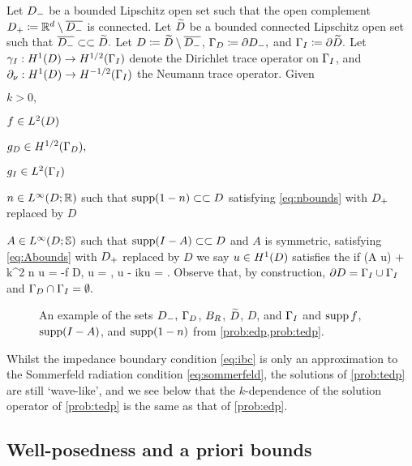 \label{prob:tedp}
 Let $D_{-}$ be a bounded Lipschitz open set such that the open complement $D_{+} \coloneqq \mathbb R^{d} \setminus \overline{D_{-}}$ is connected. Let $\widetilde{D}$ be a bounded connected Lipschitz open set such that $\overline{D_{-}} \subset\subset \widetilde{D}.$ Let $D \coloneqq \widetilde{D} \setminus \overline{D_{-}}$, $\Gamma_{D} \coloneqq \partial D_{-},$ and $\Gamma_{I} \coloneqq \partial \widetilde{D}.$ Let $\trI: \HoD\rightarrow\HhGI$ denote the Dirichlet trace operator on $\Gamma_{I}$, and $\dn:\HoD\rightarrow\HmhGI$ the Neumann trace operator. Given
  \bit
  \item $k > 0,$
\item $f \in \LtD$
\item $\gD \in \HhGD,$
  \item $\gI \in \LtGI$
\item $n \in \LiDRR$ such that $\supp\mleft(1-n\mright) \compcont D$ satisfying \eqref{eq:nbounds} with $D_{+}$ replaced by $D$
\item $A \in \LiDRRdtd$ such that $\supp\mleft(I-A\mright)\compcont D$ and $A$ is symmetric, satisfying \eqref{eq:Abounds} with $D_{+}$ replaced by $D$
  \eit
  we say $u \in \HoD$ satisfies the  if
  \beq\label{eq:tedp}
\grad \cdot \mleft(A \grad u\mright) + k^2 n u = -f \tin D,
\eeq
\beqs
\trGD u = \gD, \ton \GD \tand
\eeqs
\beq\label{eq:ibc}
\dn u - ik\trGI u = \gI \ton \GI.
\eeq
\eprob
Observe that, by construction, $\partial D = \Gamma_{I} \cup \Gamma_{I}$ and $\Gamma_{D} \cap \Gamma_{I} = \emptyset.$

\begin{figure}
\begin{centering}

\caption{An example of the sets $D_{-},$ $\Gamma_{D}$, $B_{R}$, $\widetilde{D}$, $D$, and $\Gamma_{I}$ and $\operatorname{supp} f$, $\operatorname{supp}(I-A)$, and $\operatorname{supp}(1-n)$ from \cref{prob:edp,prob:tedp}.}
\end{centering}
\end{figure}

Whilst the impedance boundary condition \eqref{eq:ibc} is only an approximation to the Sommerfeld radiation condition \eqref{eq:sommerfeld}, the solutions of \cref{prob:tedp} are still `wave-like', and we  see below that the $k$-dependence of the solution operator of \cref{prob:tedp} is the same as that of \cref{prob:edp}.

  \subsection{Well-posedness and a priori bounds}\label{sec:wpbounds}

